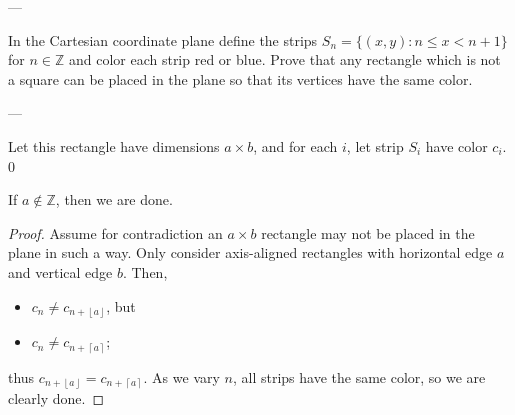 
---

In the Cartesian coordinate plane define the strips $S_n=\{(x,y):n\le x<n+1\}$ for $n\in\mathbb Z$ and color each strip red or blue. Prove that any rectangle which is not a square can be placed in the plane so that its vertices have the same color.

---

Let this rectangle have dimensions $a\times b$, and for each $i$, let strip $S_i$ have color $c_i$.
\setcounter{claim}0
\begin{claim}
    If $a\not\in\mathbb Z$, then we are done.
\end{claim}
\begin{proof}
    Assume for contradiction an $a\times b$ rectangle may not be placed in the plane in such a way. Only consider axis-aligned rectangles with horizontal edge $a$ and vertical edge $b$. Then,
    \begin{itemize}[itemsep=0em]
        \item $c_n\ne c_{n+\left\lfloor a\right\rfloor}$, but
        \item $c_n\ne c_{n+\left\lceil a\right\rceil}$;
    \end{itemize}
    thus $c_{n+\left\lfloor a\right\rfloor}=c_{n+\left\lceil a\right\rceil}$. As we vary $n$, all strips have the same color, so we are clearly done.
\end{proof}

